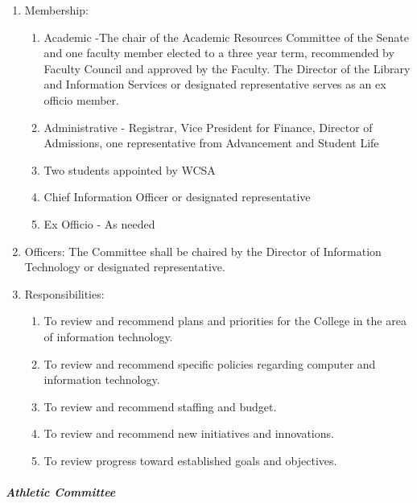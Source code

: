 \documentclass[letterpaper, 11pt]{article}
\begin{document}
					\begin{enumerate}[label=\alph*)]
						\item{Membership:
							\begin{enumerate}[label=\arabic*)]
								\item{Academic -The chair of the Academic Resources Committee of the Senate and one faculty member elected to a three year term, recommended by Faculty Council and approved by the Faculty.  The Director of the Library and Information Services or designated representative serves as an ex officio member.}
								\item{Administrative - Registrar, Vice President for Finance, Director of Admissions, one representative from Advancement and Student Life}
								\item{Two students appointed by WCSA}
								\item{Chief Information Officer or designated representative}
								\item{Ex Officio - As needed}
							\end{enumerate}
						}
						\item{Officers:
							The Committee shall be chaired by the Director of Information Technology or designated representative.
						}
						\item{Responsibilities:
							\begin{enumerate}[label=\arabic*)]
								\item{To review and recommend plans and priorities for the College in the area of information technology.}
								\item{To review and recommend specific policies regarding computer and information technology.}
								\item{To review and recommend staffing and budget.}
								\item{To review and recommend new initiatives and innovations.}
								\item{To review progress toward established goals and objectives.}
							\end{enumerate}
						}
					\end{enumerate}
				\subparagraph{Athletic Committee}
\end{document}
